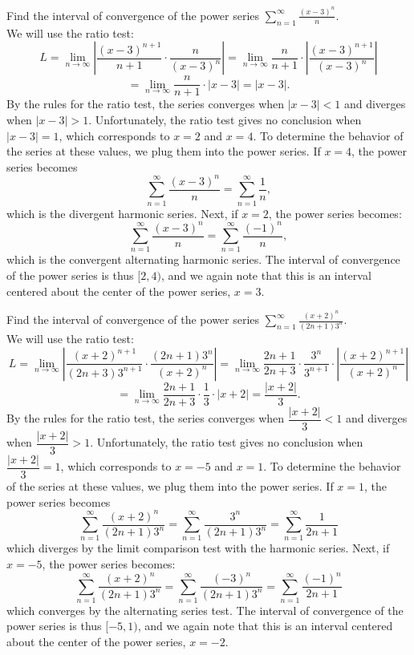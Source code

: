 \documentclass{ximera}
\begin{document}
\begin{example}[example 4]
Find the interval of convergence of the power series $\displaystyle{\sum_{n=1}^\infty \frac{(x-3)^n}{n}}$.\\
We will use the ratio test:
\[
L = \lim_{n \to \infty} \left|\frac{(x-3)^{n+1}}{n+1} \cdot \frac{n}{(x-3)^n} \right| = \lim_{n \to \infty} \frac{n}{n+1} \cdot \left|  \frac{(x-3)^{n+1}}{(x-3)^n} \right| 
\]
\[
= \lim_{n \to \infty} \frac{n}{n+1}\cdot |x-3| = |x-3|.
\]
By the rules for the ratio test, the series converges when $|x-3| < 1$ and diverges when $|x-3| > 1$.
Unfortunately, the ratio test gives no conclusion when $|x-3| = 1$, which corresponds to $x = 2$ and $x = 4$.
To determine the behavior of the series at these values, we plug them into the power series.
If $x = 4$, the power series becomes
\[
\sum_{n=1}^\infty \frac{(x-3)^n}{n} = \sum_{n=1}^\infty \frac{1}{n},
\]
which is the divergent harmonic series.
Next, if $x = 2$, the power series becomes:
\[
\sum_{n=1}^\infty \frac{(x-3)^n}{n} = \sum_{n=1}^\infty \frac{(-1)^n}{n},
\]
which is the convergent alternating harmonic series.
The interval of convergence of the power series is thus $[2, 4)$, and we again note that this is an interval centered about the 
center of the power series, $x = 3$.
\end{example}


\begin{example}[example 5]
Find the interval of convergence of the power series $\displaystyle{\sum_{n=1}^\infty \frac{(x+2)^n}{(2n+1)3^n}}$.\\
We will use the ratio test:
\[
L = \lim_{n \to \infty} \left|\frac{(x+2)^{n+1}}{(2n+3)3^{n+1}} \cdot \frac{(2n+1) 3^n}{(x+2)^n} \right| = 
\lim_{n \to \infty} \frac{2n+1}{2n+3} \cdot \frac{3^n}{3^{n+1}} \cdot \left|  \frac{(x+2)^{n+1}}{(x+2)^n} \right| 
\]
\[
= \lim_{n \to \infty} \frac{2n+1}{2n+3} \cdot \frac13 \cdot \left|  x+2 \right| = \frac{|x+2|}{3}.
\]
By the rules for the ratio test, the series converges when $\dfrac{|x+2|}{3} < 1$ and diverges when $\dfrac{|x+2|}{3} > 1$.
Unfortunately, the ratio test gives no conclusion when $\dfrac{|x+2|}{3} = 1$, which corresponds to $x = -5$ and $x = 1$.
To determine the behavior of the series at these values, we plug them into the power series.
If $x = 1$, the power series becomes
\[
\sum_{n=1}^\infty \frac{(x+2)^n}{(2n+1)3^n} = \sum_{n=1}^\infty \frac{3^n}{(2n+1)3^n} = \sum_{n=1}^\infty \frac{1}{2n+1}
\]
which diverges by the limit comparison test with the harmonic series.
Next, if $x = -5$, the power series becomes:
\[
\sum_{n=1}^\infty \frac{(x+2)^n}{(2n+1)3^n} = \sum_{n=1}^\infty \frac{(-3)^n}{(2n+1)3^n} = \sum_{n=1}^\infty \frac{(-1)^n}{2n+1}
\]
which converges by the alternating series test.
The interval of convergence of the power series is thus $[-5, 1)$, and we again note that this is an interval centered about the 
center of the power series, $x = -2$.
\end{example}
\end{document}
